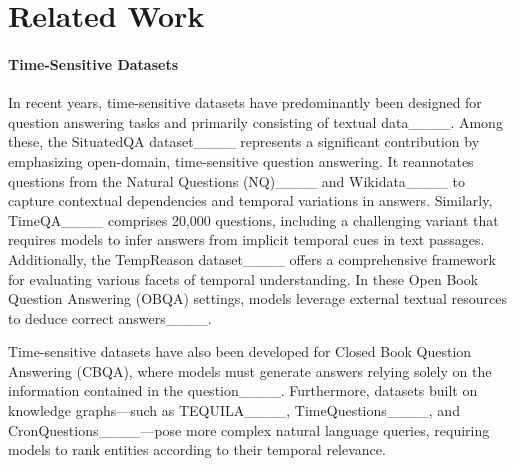 \section{Related Work}
\paragraph{Time-Sensitive Datasets}
In recent years, time-sensitive datasets have predominantly been designed for question answering tasks and primarily consisting of textual data____. Among these, the SituatedQA dataset____ represents a significant contribution by emphasizing open-domain, time-sensitive question answering. It reannotates questions from the Natural Questions (NQ)____ and Wikidata____ to capture contextual dependencies and temporal variations in answers. Similarly, TimeQA____ comprises 20,000 questions, including a challenging variant that requires models to infer answers from implicit temporal cues in text passages. Additionally, the TempReason dataset____ offers a comprehensive framework for evaluating various facets of temporal understanding. In these Open Book Question Answering (OBQA) settings, models leverage external textual resources to deduce correct answers____.

Time-sensitive datasets have also been developed for Closed Book Question Answering (CBQA), where models must generate answers relying solely on the information contained in the question____. Furthermore, datasets built on knowledge graphs—such as TEQUILA____, TimeQuestions____, and CronQuestions____—pose more complex natural language queries, requiring models to rank entities according to their temporal relevance.


